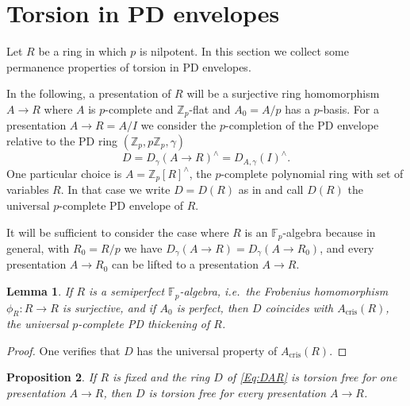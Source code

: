 \documentclass[a4paper,11pt]{article}
\theoremstyle{plain}
\newtheorem{Lemma}{Lemma}
\newtheorem{Prop}[Lemma]{Proposition}
\theoremstyle{definition}
\theoremstyle{remark}
\theoremstyle{definition}
\numberwithin{Lemma}{section}
\numberwithin{Subpoint}{Lemma}
\numberwithin{equation}{section}
\newcommand{\FF}{{\mathbb{F}}}
\newcommand{\ZZ}{{\mathbb{Z}}}
\DeclareMathOperator{\cris}{cris}
\newcommand{\chang}[1]{{#1}}
\begin{document}
\section{Torsion in PD envelopes}
\label{Se:torsion-PD}

Let $R$ be a ring in which $p$ is nilpotent.
In this section we collect some permanence properties
of torsion in PD envelopes.

In the following, a presentation of $R$ will be
a surjective ring homomorphism $A\to R$ where $A$ is 
\chang{$p$-complete} 
and $\ZZ_p$-flat and $A_0=A/p$ has a $p$-basis.
For a presentation $A\to R=A/I$ we consider the \chang{$p$-completion} 
of the PD envelope relative to the PD ring $(\ZZ_p,p\ZZ_p,\gamma)$
\begin{equation}
\label{Eq:DAR}
D=D_\gamma(A\to R)^\wedge=D_{A,\gamma}(I)^\wedge.
\end{equation}
One particular choice is $A=\ZZ_p[R]^\wedge$, 
the \chang{$p$-complete} polynomial ring with set of variables $R$.
In that case we write $D=D(R)$ as in \cite{Jong-Messing}
and call $D(R)$ the universal \chang{$p$-complete} PD envelope of $R$.

It will be sufficient to consider the case where $R$ is an $\FF_p$-algebra 
because in general, with $R_0=R/p$ we have $D_\gamma(A\to R)=D_\gamma(A\to R_0)$,
and every presentation $A\to R_0$ can be lifted to a presentation $A\to R$.

\begin{Lemma}
\label{Le:D-Acris}
If $R$ is a semiperfect $\FF_p$-algebra,
i.e.\ the Frobenius \chang{homomorphism} $\phi_R:R\to R$ is surjective,
and if $A_0$ is perfect, then $D$ coincides with $A_{\cris}(R)$, 
the universal \chang{$p$-complete} PD thickening of $R$.
\end{Lemma}

\begin{proof}
One verifies that $D$ has the universal property of $A_{\cris}(R)$.
\end{proof}

\begin{Prop}
\label{Pr:PD-env-tf}
If $R$ is fixed and the ring $D$ of \eqref{Eq:DAR}
is torsion free for one presentation $A\to R$, 
then $D$ is torsion free for every presentation $A\to R$.
\end{Prop}
\end{document}
